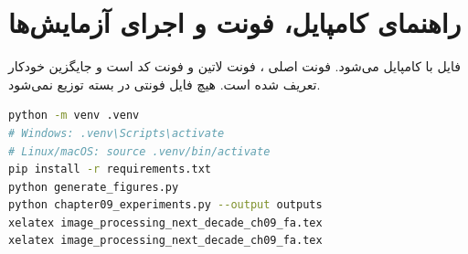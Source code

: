 \documentclass[12pt,openany,oneside]{book}
\begin{document}
\chapter*{راهنمای کامپایل، فونت و اجرای آزمایش‌ها}
فایل با  کامپایل می‌شود. فونت اصلی ، فونت لاتین  و فونت کد
 است و جایگزین خودکار تعریف شده است. هیچ فایل فونتی در بسته توزیع نمی‌شود.

\begin{latin}
\begin{lstlisting}[language=bash]
python -m venv .venv
# Windows: .venv\Scripts\activate
# Linux/macOS: source .venv/bin/activate
pip install -r requirements.txt
python generate_figures.py
python chapter09_experiments.py --output outputs
xelatex image_processing_next_decade_ch09_fa.tex
xelatex image_processing_next_decade_ch09_fa.tex
\end{lstlisting}
\end{latin}
\end{document}
